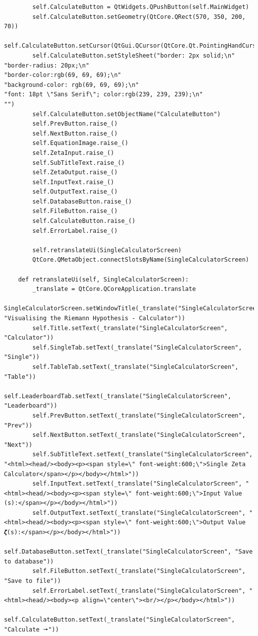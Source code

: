 \documentclass{article}
\begin{document}
\begin{lstlisting}
        self.CalculateButton = QtWidgets.QPushButton(self.MainWidget)
        self.CalculateButton.setGeometry(QtCore.QRect(570, 350, 200, 70))
        self.CalculateButton.setCursor(QtGui.QCursor(QtCore.Qt.PointingHandCursor))
        self.CalculateButton.setStyleSheet("border: 2px solid;\n"
"border-radius: 20px;\n"
"border-color:rgb(69, 69, 69);\n"
"background-color: rgb(69, 69, 69);\n"
"font: 18pt \"Sans Serif\"; color:rgb(239, 239, 239);\n"
"")
        self.CalculateButton.setObjectName("CalculateButton")
        self.PrevButton.raise_()
        self.NextButton.raise_()
        self.EquationImage.raise_()
        self.ZetaInput.raise_()
        self.SubTitleText.raise_()
        self.ZetaOutput.raise_()
        self.InputText.raise_()
        self.OutputText.raise_()
        self.DatabaseButton.raise_()
        self.FileButton.raise_()
        self.CalculateButton.raise_()
        self.ErrorLabel.raise_()

        self.retranslateUi(SingleCalculatorScreen)
        QtCore.QMetaObject.connectSlotsByName(SingleCalculatorScreen)

    def retranslateUi(self, SingleCalculatorScreen):
        _translate = QtCore.QCoreApplication.translate
        SingleCalculatorScreen.setWindowTitle(_translate("SingleCalculatorScreen", "Visualising the Riemann Hypothesis - Calculator"))
        self.Title.setText(_translate("SingleCalculatorScreen", "Calculator"))
        self.SingleTab.setText(_translate("SingleCalculatorScreen", "Single"))
        self.TableTab.setText(_translate("SingleCalculatorScreen", "Table"))
        self.LeaderboardTab.setText(_translate("SingleCalculatorScreen", "Leaderboard"))
        self.PrevButton.setText(_translate("SingleCalculatorScreen", "Prev"))
        self.NextButton.setText(_translate("SingleCalculatorScreen", "Next"))
        self.SubTitleText.setText(_translate("SingleCalculatorScreen", "<html><head/><body><p><span style=\" font-weight:600;\">Single Zeta Calculator</span></p></body></html>"))
        self.InputText.setText(_translate("SingleCalculatorScreen", "<html><head/><body><p><span style=\" font-weight:600;\">Input Value (s):</span></p></body></html>"))
        self.OutputText.setText(_translate("SingleCalculatorScreen", "<html><head/><body><p><span style=\" font-weight:600;\">Output Value 𝜻(s):</span></p></body></html>"))
        self.DatabaseButton.setText(_translate("SingleCalculatorScreen", "Save to database"))
        self.FileButton.setText(_translate("SingleCalculatorScreen", "Save to file"))
        self.ErrorLabel.setText(_translate("SingleCalculatorScreen", "<html><head/><body><p align=\"center\"><br/></p></body></html>"))
        self.CalculateButton.setText(_translate("SingleCalculatorScreen", "Calculate 🠖"))
\end{lstlisting}
\end{document}
